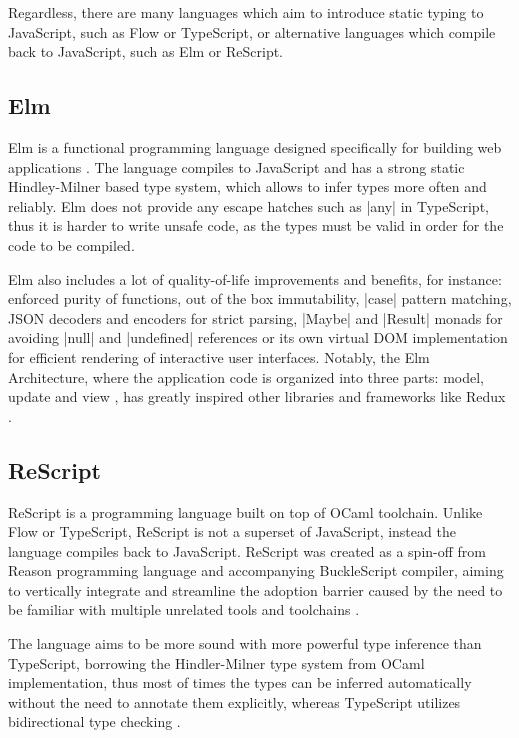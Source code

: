 Regardless, there are many languages which aim to introduce static typing to JavaScript, such as Flow or TypeScript, or alternative languages which compile back to JavaScript, such as Elm or ReScript.

\subsection{Elm}

Elm is a functional programming language designed specifically for building web applications \cite{ElmDelightfulLanguage}. The language compiles to JavaScript and has a strong static Hindley-Milner based type system, which allows to infer types more often and reliably. Elm does not provide any escape hatches such as \codeword|any| in TypeScript, thus it is harder to write unsafe code, as the types must be valid in order for the code to be compiled.

Elm also includes a lot of quality-of-life improvements and benefits, for instance: enforced purity of functions, out of the box immutability, \codeword|case| pattern matching, JSON decoders and encoders for strict parsing, \codeword|Maybe| and \codeword|Result| monads for avoiding \codeword|null| and \codeword|undefined| references or its own virtual DOM implementation for efficient rendering of interactive user interfaces. Notably, the Elm Architecture, where the application code is organized into three parts: model, update and view \cite{ElmArchitectureIntroduction}, has greatly inspired other libraries and frameworks like Redux \cite{PriorArtRedux2022}.

\subsection{ReScript}

ReScript is a programming language built on top of OCaml toolchain. Unlike Flow or TypeScript, ReScript is not a superset of JavaScript, instead the language compiles back to JavaScript. ReScript was created as a spin-off from Reason programming language and accompanying BuckleScript compiler, aiming to vertically integrate and streamline the adoption barrier caused by the need to be familiar with multiple unrelated tools and toolchains \cite{BuckleScriptReasonRebranding}.

The language aims to be more sound with more powerful type inference than TypeScript, borrowing the Hindler-Milner type system from OCaml implementation, thus most of times the types can be inferred automatically without the need to annotate them explicitly, whereas TypeScript utilizes bidirectional type checking \cite{ReconstructingTypeScriptPart}.

